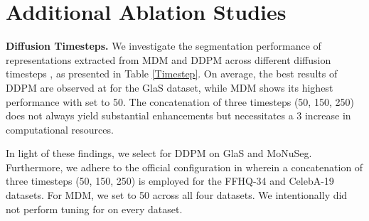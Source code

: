 \documentclass{article} \usepackage{iclr2024_conference,times}
\begin{document}
\section{Additional Ablation Studies} \label{ablation}
\textbf{Diffusion Timesteps.} We investigate the segmentation performance of representations extracted from MDM and DDPM across different diffusion timesteps , as presented in Table \ref{Timestep}. On average, the best results of DDPM are observed at  for the GlaS dataset, while MDM shows its highest performance with  set to 50. The concatenation of three timesteps (50, 150, 250) does not always yield substantial enhancements but necessitates a 3 increase in computational resources.

In light of these findings, we select  for DDPM on GlaS and MoNuSeg. Furthermore, we adhere to the official configuration in \citet{DBLP:conf/iclr/BaranchukVRKB22} wherein a concatenation of three timesteps (50, 150, 250) is employed for the FFHQ-34 and CelebA-19 datasets.
For MDM, we set  to 50 across all four datasets. We intentionally did not perform tuning for  on every dataset.
\end{document}
